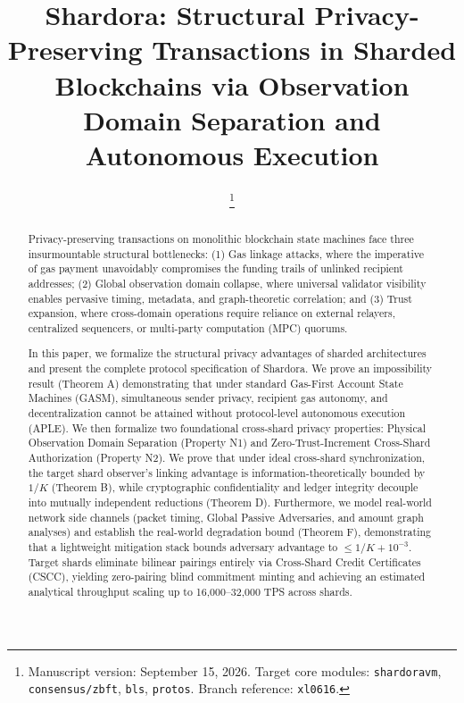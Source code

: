 \documentclass[journal,10pt,twocolumn]{IEEEtran}
\theoremstyle{definition}
\theoremstyle{remark}
\begin{document}
\title{Shardora: Structural Privacy-Preserving Transactions in Sharded Blockchains via Observation Domain Separation and Autonomous Execution}

\author{
    \thanks{Manuscript version: September 15, 2026. Target core modules: \texttt{shardoravm}, \texttt{consensus/zbft}, \texttt{bls}, \texttt{protos}. Branch reference: \texttt{xl0616}.}
}

\maketitle

\begin{abstract}
Privacy-preserving transactions on monolithic blockchain state machines face three insurmountable structural bottlenecks: (1) Gas linkage attacks, where the imperative of gas payment unavoidably compromises the funding trails of unlinked recipient addresses; (2) Global observation domain collapse, where universal validator visibility enables pervasive timing, metadata, and graph-theoretic correlation; and (3) Trust expansion, where cross-domain operations require reliance on external relayers, centralized sequencers, or multi-party computation (MPC) quorums. 

In this paper, we formalize the structural privacy advantages of sharded architectures and present the complete protocol specification of Shardora. We prove an impossibility result (Theorem A) demonstrating that under standard Gas-First Account State Machines (GASM), simultaneous sender privacy, recipient gas autonomy, and decentralization cannot be attained without protocol-level autonomous execution (APLE). We then formalize two foundational cross-shard privacy properties: Physical Observation Domain Separation (Property N1) and Zero-Trust-Increment Cross-Shard Authorization (Property N2). We prove that under ideal cross-shard synchronization, the target shard observer's linking advantage is information-theoretically bounded by $1/K$ (Theorem B), while cryptographic confidentiality and ledger integrity decouple into mutually independent reductions (Theorem D). Furthermore, we model real-world network side channels (packet timing, Global Passive Adversaries, and amount graph analyses) and establish the real-world degradation bound (Theorem F), demonstrating that a lightweight mitigation stack bounds adversary advantage to $\le 1/K + 10^{-3}$. Target shards eliminate bilinear pairings entirely via Cross-Shard Credit Certificates (CSCC), yielding zero-pairing blind commitment minting and achieving an estimated analytical throughput scaling up to 16,000--32,000 TPS across shards.
\end{abstract}
\end{document}
